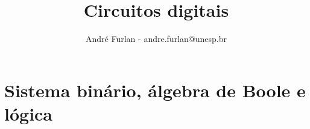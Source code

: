 

\title{Circuitos digitais}


\author{André Furlan - andre.furlan@unesp.br}

\date{\the\year}


	
	\frame{\titlepage}
	
	\section{Sistema binário, álgebra de Boole e lógica}
		
		
		

%		
	
